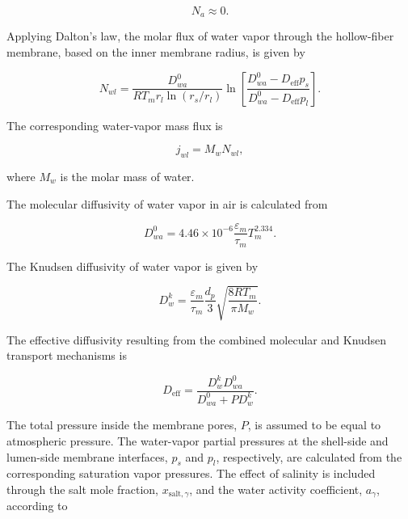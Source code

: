 \documentclass[14pt,letterpaper,fleqn]{extarticle}
\begin{document}
\begin{equation}
N_a
\approx
0.
\label{eq:stationary-air}
\end{equation}

Applying Dalton's law, the molar flux of water vapor through the hollow-fiber
membrane, based on the inner membrane radius, is given by

\begin{equation}
N_{wl}
=
\frac{
D_{wa}^{0}
}{
RT_mr_l\ln\left(r_s/r_l\right)
}
\ln
\left[
\frac{
D_{wa}^{0}-D_{\mathrm{eff}}p_s
}{
D_{wa}^{0}-D_{\mathrm{eff}}p_l
}
\right].
\label{eq:water-molar-flux}
\end{equation}

The corresponding water-vapor mass flux is

\begin{equation}
j_{wl}
=
M_wN_{wl},
\label{eq:water-mass-flux}
\end{equation}

where $M_w$ is the molar mass of water.

The molecular diffusivity of water vapor in air is calculated from

\begin{equation}
D_{wa}^{0}
=
4.46\times10^{-6}
\frac{\varepsilon_m}{\tau_m}
T_m^{2.334}.
\label{eq:water-air-diffusivity}
\end{equation}

The Knudsen diffusivity of water vapor is given by

\begin{equation}
D_w^k
=
\frac{\varepsilon_m}{\tau_m}
\frac{d_p}{3}
\sqrt{
\frac{8RT_m}{\pi M_w}
}.
\label{eq:knudsen-diffusivity}
\end{equation}

The effective diffusivity resulting from the combined molecular and Knudsen
transport mechanisms is

\begin{equation}
D_{\mathrm{eff}}
=
\frac{
D_w^kD_{wa}^{0}
}{
D_{wa}^{0}+PD_w^k
}.
\label{eq:effective-diffusivity}
\end{equation}

The total pressure inside the membrane pores, $P$, is assumed to be equal to
atmospheric pressure. The water-vapor partial pressures at the shell-side and
lumen-side membrane interfaces, $p_s$ and $p_l$, respectively, are calculated
from the corresponding saturation vapor pressures. The effect of salinity is
included through the salt mole fraction, $x_{\mathrm{salt},\gamma}$, and the
water activity coefficient, $a_\gamma$, according to
\end{document}
